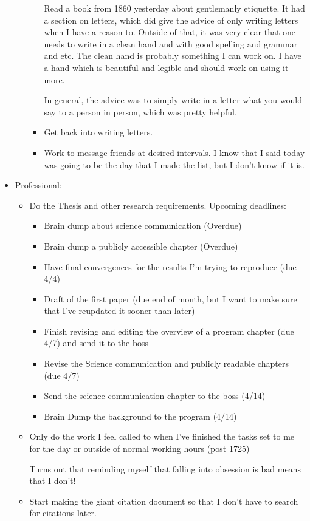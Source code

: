 \documentclass[12pt]{article}[titlepage]
\newcommand{\1}{\={a}}
\newcommand{\2}{\={e}}
\newcommand{\3}{\={\i}}
\newcommand{\4}{\=o}
\newcommand{\5}{\=u}
\newcommand{\6}{\={A}}
\renewcommand{\,}{\textsuperscript{,}}
\begin{document}
\begin{itemize}
\begin{itemize}
\begin{itemize}
Read a book from 1860 yesterday about gentlemanly etiquette.  
It had a section on letters, which did give the advice of only writing letters when I have a reason to.  
Outside of that, it was very clear that one needs to write in a clean hand and with good spelling and grammar and etc.  
The clean hand is probably something I can work on. I have a hand which is beautiful and legible and should work on using it more.

In general, the advice was to simply write in a letter what you would say to a person in person, which was pretty helpful.  
\item Get back into writing letters.   
\item Work to message friends at desired intervals.  
I know that I said today was going to be the day that I made the list, but I don't know if it is.  
\end{itemize}

\end{itemize}  
\item Professional:   
\begin{itemize}   
\item Do the Thesis and other research requirements. Upcoming deadlines:  
\begin{itemize}  
\item Brain dump about science communication (Overdue)  
\item Brain dump a publicly accessible chapter (Overdue)  
\item Have final convergences for the results I'm trying to reproduce (due 4/4)  
\item Draft of the first paper (due end of month, but I want to make sure that I've reupdated it sooner than later)  
\item Finish revising and editing the overview of a program chapter (due 4/7) and send it to the boss  
\item Revise the Science communication and publicly readable chapters (due 4/7)  
\item Send the science communication chapter to the boss (4/14)  
\item Brain Dump the background to the program (4/14)  
\end{itemize}  
\item Only do the work I feel called to when I've finished the tasks set to me for the day or outside of normal working hours (post 1725)

Turns out that reminding myself that falling into obsession is bad means that I don't!  
\item Start making the giant citation document so that I don't have to search for citations later.


\end{itemize}
\end{itemize}
\end{document}
